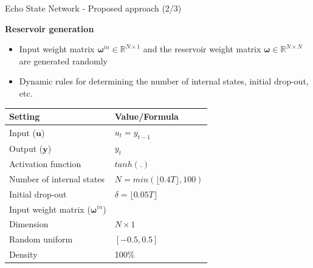 \documentclass[aspectratio=169]{beamer}
\begin{document}
\begin{frame}[t]{Echo State Network - Proposed approach (2/3)}
    \begin{minipage}[t]{0.3\textwidth}
        \vspace{0pt}
        \textbf{Reservoir generation}
        \begin{itemize}
        	\item Input weight matrix $\boldsymbol{\omega}^{in} \in \mathbb{R}^{N \times 1}$ and the reservoir weight matrix $\boldsymbol{\omega} \in \mathbb{R}^{N \times N}$ are generated randomly
        	\item Dynamic rules for determining the number of internal states, initial drop-out, etc.
        \end{itemize}
    \end{minipage}%
    \hfill
    \begin{minipage}[t]{0.7\textwidth}
        \vspace{0pt}
        	\begin{table}[ht]
        	\scriptsize
			\centering
				\begin{tabular}{ll}
				\toprule
				\textbf{Setting}                                    & \textbf{Value/Formula}               \\
				\midrule
				Input ($\mathbf{u}$)                                & $u_t = y_{t-1}$                            \\
				Output ($\mathbf{y}$)                               & $y_{t}$                              \\
				Activation function                                 & $tanh(.)$                            \\
				Number of internal states                           & $N = min(\lfloor 0.4T \rfloor, 100)$ \\
				Initial drop-out                                    & $\delta = \lfloor 0.05T \rfloor$     \\
				\midrule
				Input weight matrix ($\boldsymbol{\omega}^{in}$)    &                                      \\
				\hspace{2.5mm} Dimension                            & $N \times 1$                         \\
				\hspace{2.5mm} Random uniform                       & $[-0.5, 0.5]$                        \\
				\hspace{2.5mm} Density                              & 100\%                                \\

\end{tabular}
\end{table}
\end{minipage}
\end{frame}
\end{document}

